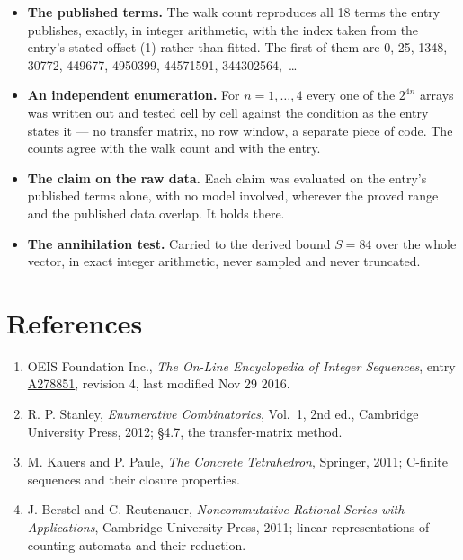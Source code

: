 \documentclass[11pt]{article}
\theoremstyle{definition}
\begin{document}
\begin{itemize}

\item {\bfseries The published terms.} The walk count reproduces all 18 terms the entry publishes, exactly, in integer arithmetic, with the index taken from the entry's stated offset (1) rather than fitted. The first of them are 0, 25, 1348, 30772, 449677, 4950399, 44571591, 344302564,~\dots

\item {\bfseries An independent enumeration.} For $n = 1,\dots,4$ every one of the $2^{4n}$ arrays was written out and tested cell by cell against the condition as the entry states it --- no transfer matrix, no row window, a separate piece of code. The counts agree with the walk count and with the entry.

\item {\bfseries The claim on the raw data.} Each claim was evaluated on the entry's published terms alone, with no model involved, wherever the proved range and the published data overlap. It holds there.

\item {\bfseries The annihilation test.} Carried to the derived bound $S = 84$ over the whole vector, in exact integer arithmetic, never sampled and never truncated.

\end{itemize}

\section{References}

\begin{enumerate}

\item OEIS Foundation Inc., \emph{The On-Line Encyclopedia of Integer Sequences}, entry \href{https://oeis.org/A278851}{A278851}, revision 4, last modified Nov 29 2016.

\item R. P. Stanley, \emph{Enumerative Combinatorics}, Vol.~1, 2nd ed., Cambridge University Press, 2012; \S4.7, the transfer-matrix method.

\item M. Kauers and P. Paule, \emph{The Concrete Tetrahedron}, Springer, 2011; C-finite sequences and their closure properties.

\item J. Berstel and C. Reutenauer, \emph{Noncommutative Rational Series with Applications}, Cambridge University Press, 2011; linear representations of counting automata and their reduction.

\end{enumerate}
\end{document}

